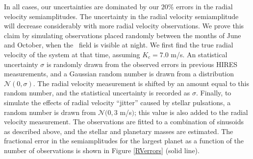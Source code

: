 In all cases, our uncertainties are dominated by our $20 \%$ errors in the radial velocity semiamplitudes. The uncertainty in the radial velocity semiamplitude will decrease considerably with more radial velocity observations. We prove this claim by simulating observations placed randomly between the months of June and October, when the \kep\ field is visible at night. We first find the true radial velocity of the system at that time, assuming $K_c = 7.0$ m/s. An statistical uncertainty $\sigma$ is randomly drawn from the observed errors in previous HIRES measurements, and a Gaussian random number is drawn from a distribution $\mathcal{N}(0,\sigma)$. The radial velocity measurement is shifted by an amount equal to this random number, and the statistical uncertainty is recorded as $\sigma$. Finally, to simulate the effects of radial velocity ``jitter'' caused by stellar pulsations, a random number is drawn from $\mathcal{N}(0,3 $ m/s$)$; this value is also added to the radial velocity measurement. The observations are fitted to a combination of sinusoids as described above, and the stellar and planetary masses are estimated. The fractional error in the semiamplitudes for the largest planet as a function of the number of observations is shown in Figure \ref{RVerrors} (solid line).


